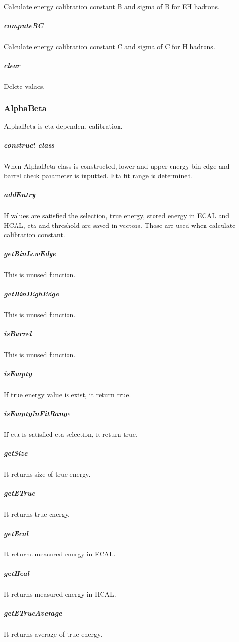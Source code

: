 \documentclass{cernrep}
\begin{document}
Calculate energy calibration constant B and sigma of B for EH hadrons.

\subparagraph{computeBC}

Calculate energy calibration constant C and sigma of C for H hadrons.

\subparagraph{clear}

Delete values.

\subsubsection{AlphaBeta}

AlphaBeta is eta dependent calibration.

\subparagraph{construct class}

When AlphaBeta class is constructed, lower and upper energy bin edge and barrel check parameter is inputted. Eta fit range is determined.

\subparagraph{addEntry}

If values are satisfied the selection, true energy, stored energy in ECAL and HCAL, eta and threshold are saved in vectors. Those are used when calculate calibration constant.

\subparagraph{getBinLowEdge}

This is unused function.

\subparagraph{getBinHighEdge}

This is unused function.

\subparagraph{isBarrel}

This is unused function.

\subparagraph{isEmpty}

If true energy value is exist, it return true.

\subparagraph{isEmptyInFitRange}

If eta is satisfied eta selection, it return true.

\subparagraph{getSize}

It returns size of true energy.

\subparagraph{getETrue}

It returns true energy.

\subparagraph{getEcal}

It returns measured energy in ECAL.

\subparagraph{getHcal}

It returns measured energy in HCAL.

\subparagraph{getETrueAverage}

It returns average of true energy.
\end{document}
